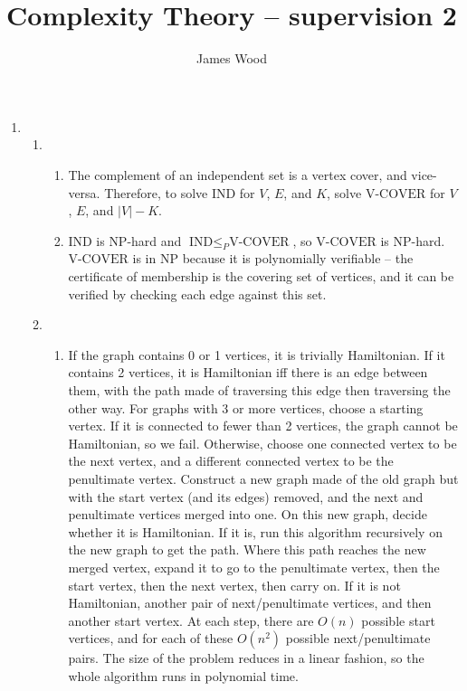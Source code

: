 \documentclass{article}
\begin{document}
\title{Complexity Theory -- supervision 2}
\author{James Wood}
\maketitle

\begin{enumerate}
  \item
    \begin{enumerate}[label=\arabic{enumii}.]
      \item
        \begin{enumerate}[label=(\alph{enumiii})]
          \item The complement of an independent set is a vertex cover, and vice-versa. Therefore, to solve $\textrm{IND}$ for $V$, $E$, and $K$, solve $\textrm{V-COVER}$ for $V$, $E$, and $\lvert V \rvert - K$.
          \item
            $\textrm{IND}$ is $\textrm{NP}$-hard and $\textrm{IND} \leq_P \textrm{V-COVER}$, so $\textrm{V-COVER}$ is $\textrm{NP}$-hard. $\textrm{V-COVER}$ is in $\textrm{NP}$ because it is polynomially verifiable -- the certificate of membership is the covering set of vertices, and it can be verified by checking each edge against this set.
        \end{enumerate}
        \setcounter{enumii}{6}
      \item
        \begin{enumerate}[label=(\alph{enumiii})]
          \item
            If the graph contains 0 or 1 vertices, it is trivially Hamiltonian. If it contains 2 vertices, it is Hamiltonian iff there is an edge between them, with the path made of traversing this edge then traversing the other way. For graphs with 3 or more vertices, choose a starting vertex. If it is connected to fewer than 2 vertices, the graph cannot be Hamiltonian, so we fail. Otherwise, choose one connected vertex to be the next vertex, and a different connected vertex to be the penultimate vertex. Construct a new graph made of the old graph but with the start vertex (and its edges) removed, and the next and penultimate vertices merged into one. On this new graph, decide whether it is Hamiltonian. If it is, run this algorithm recursively on the new graph to get the path. Where this path reaches the new merged vertex, expand it to go to the penultimate vertex, then the start vertex, then the next vertex, then carry on. If it is not Hamiltonian, another pair of next/penultimate vertices, and then another start vertex.
            At each step, there are $O(n)$ possible start vertices, and for each of these $O(n^2)$ possible next/penultimate pairs. The size of the problem reduces in a linear fashion, so the whole algorithm runs in polynomial time.

\end{enumerate}
\end{enumerate}
\end{enumerate}
\end{document}
